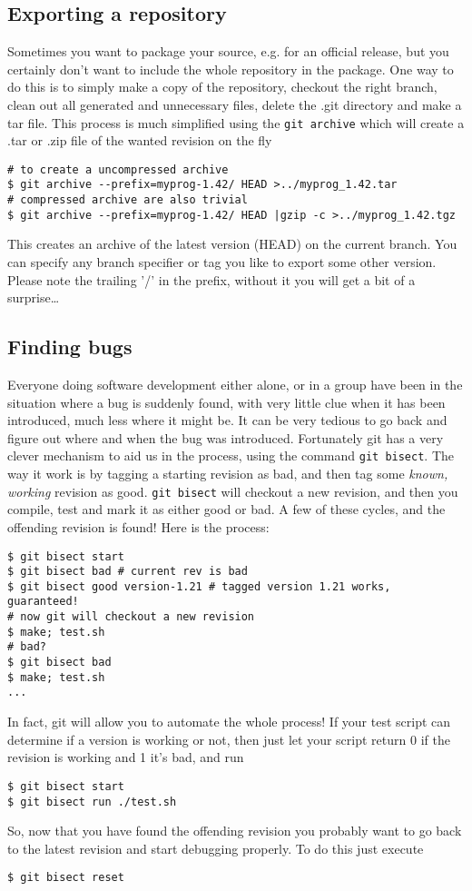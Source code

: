 \documentclass[a4paper,10pt]{article}
\begin{document}
\subsection{Exporting a repository}
Sometimes you want to package your source, e.g. for an official release, but
you certainly don't want to include the whole repository in the package. One
way to do this is to simply make a copy of the repository, checkout the right
branch, clean out all
generated and unnecessary files, delete the .git directory and make a tar
file. This process is much simplified using the \texttt{git archive} which
will create a .tar or .zip file of the wanted revision on the fly
\begin{verbatim}
# to create a uncompressed archive
$ git archive --prefix=myprog-1.42/ HEAD >../myprog_1.42.tar
# compressed archive are also trivial
$ git archive --prefix=myprog-1.42/ HEAD |gzip -c >../myprog_1.42.tgz
\end{verbatim}
This creates an archive of the latest version (HEAD) on the current branch.
You can specify any branch specifier or tag you like to export some other
version.
Please note the trailing '/' in the prefix, without it you will get a bit of a
surprise\ldots

\subsection{Finding bugs}
\label{sec:bisect}
Everyone doing software development either alone, or in a group have been in
the situation where a bug is suddenly found, with very little clue when
it has been introduced, much less where it might be. It can be very tedious to
go back and figure out where and when the bug was introduced. Fortunately git
has a very clever mechanism to aid us in the process, using the command
\texttt{git bisect}. The way it work is by tagging a starting revision as bad,
and then tag some \textit{known, working} revision as good.  \texttt{git
bisect} will checkout a new revision, and then you compile, test and mark it
as either good or bad. A few of these cycles, and the offending revision is
found! Here is the process:

\begin{verbatim}
$ git bisect start 
$ git bisect bad # current rev is bad
$ git bisect good version-1.21 # tagged version 1.21 works, guaranteed!
# now git will checkout a new revision 
$ make; test.sh 
# bad?
$ git bisect bad
$ make; test.sh
...
\end{verbatim}
In fact, git will allow you to automate the whole process! If your test script
can determine if a version is working or not, then just let your script return
0 if the revision is working and 1 it's bad, and run
\begin{verbatim}
$ git bisect start 
$ git bisect run ./test.sh
\end{verbatim}
So, now that you have found the offending revision you probably want to go 
back to the latest revision and start debugging properly. To do this just
execute
\begin{verbatim}
$ git bisect reset
\end{verbatim}
\end{document}
